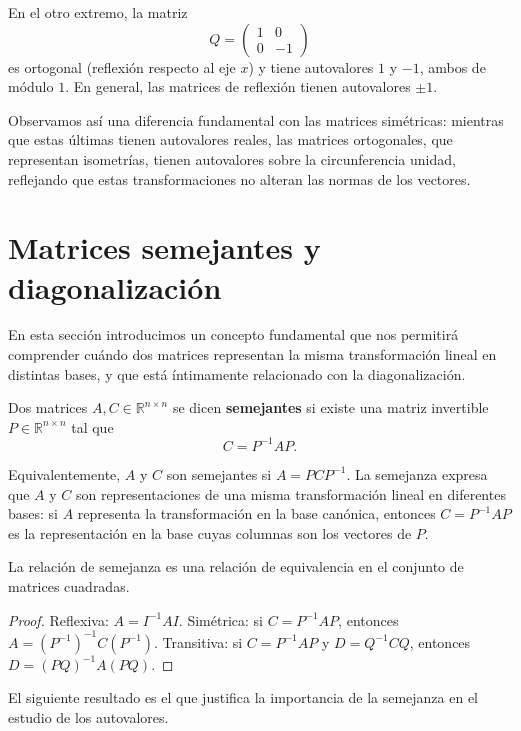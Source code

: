 En el otro extremo, la matriz
\[
Q = \begin{pmatrix} 1 & 0 \\ 0 & -1 \end{pmatrix}
\]
es ortogonal (reflexión respecto al eje $x$) y tiene autovalores $1$ y $-1$, ambos de módulo $1$. En general, las matrices de reflexión tienen autovalores $\pm 1$.

Observamos así una diferencia fundamental con las matrices simétricas: mientras que estas últimas tienen autovalores reales, las matrices ortogonales, que representan isometrías, tienen autovalores sobre la circunferencia unidad, reflejando que estas transformaciones no alteran las normas de los vectores.


\section{Matrices semejantes y diagonalización}\label{sec:semejanza}

En esta sección introducimos un concepto fundamental que nos permitirá comprender cuándo dos matrices representan la misma transformación lineal en distintas bases, y que está íntimamente relacionado con la diagonalización.


Dos matrices $A, C \in \mathbb{R}^{n\times n}$ se dicen \textbf{semejantes} si existe una matriz invertible $P \in \mathbb{R}^{n\times n}$ tal que
\[
C = P^{-1} A P.
\]

Equivalentemente, $A$ y $C$ son semejantes si $A = P C P^{-1}$. La semejanza expresa que $A$ y $C$ son representaciones de una misma transformación lineal en diferentes bases: si $A$ representa la transformación en la base canónica, entonces $C = P^{-1} A P$ es la representación en la base cuyas columnas son los vectores de $P$.


\begin{prop}
La relación de semejanza es una relación de equivalencia en el conjunto de matrices cuadradas.
\end{prop}

\begin{proof}
Reflexiva: $A=I^{-1}AI$. Simétrica: si $C=P^{-1}AP$, entonces
$A=(P^{-1})^{-1}C(P^{-1})$. Transitiva: si $C=P^{-1}AP$ y $D=Q^{-1}CQ$, entonces
$D=(PQ)^{-1}A(PQ)$.
\end{proof}

El siguiente resultado es el que justifica la importancia de la semejanza en el estudio de los autovalores.

